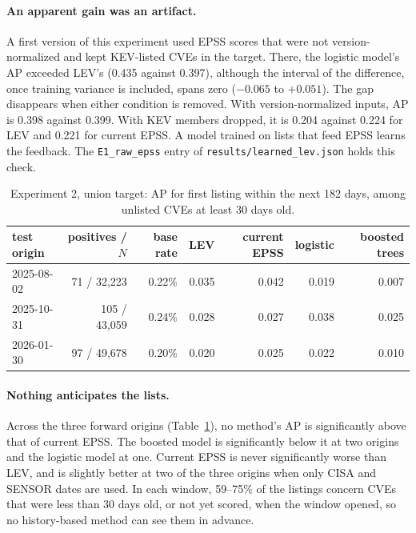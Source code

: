 \paragraph{An apparent gain was an artifact.} A first version of this
experiment used EPSS scores that were not version-normalized and kept KEV-listed
CVEs in the target. There, the logistic model's AP exceeded LEV's (0.435
against 0.397), although the interval of the difference, once training
variance is included, spans zero ($-0.065$ to $+0.051$). The gap disappears
when either condition is removed. With version-normalized inputs, AP is 0.398
against 0.399. With KEV members dropped, it is 0.204 against 0.224 for LEV and
0.221 for current EPSS. A model trained on lists that feed EPSS learns the
feedback. The \texttt{E1\_raw\_epss} entry of \texttt{results/learned\_lev.json}
holds this check.

\begin{table}[t]
\centering\small
\caption{Experiment 2, union target: AP for first listing within the next 182
days, among unlisted CVEs at least 30 days old.}\label{tab:a2}
\begin{tabular}{@{}lrrrrrr@{}}
\toprule
test origin & positives / $N$ & base rate & LEV & current EPSS & logistic & boosted trees \\
\midrule
2025-08-02 & 71 / 32,223 & 0.22\% & 0.035 & 0.042 & 0.019 & 0.007 \\
2025-10-31 & 105 / 43,059 & 0.24\% & 0.028 & 0.027 & 0.038 & 0.025 \\
2026-01-30 & 97 / 49,678 & 0.20\% & 0.020 & 0.025 & 0.022 & 0.010 \\
\bottomrule
\end{tabular}
\end{table}

\paragraph{Nothing anticipates the lists.} Across the three forward origins
(Table~\ref{tab:a2}), no method's AP is significantly above that of current
EPSS. The boosted model is significantly below it at two origins and the
logistic model at one. Current EPSS is never significantly worse than LEV, and
is slightly better at two of the three origins when only CISA and SENSOR dates
are used. In each window, 59--75\% of the listings concern CVEs that were
less than 30 days old, or not yet scored, when the window opened, so no
history-based method can see them in advance.

